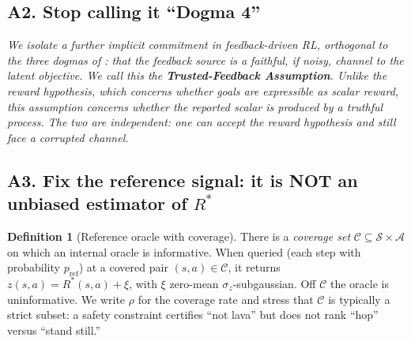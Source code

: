 \documentclass[11pt]{article}
\theoremstyle{definition}
\newtheorem{definition}{Definition}
\theoremstyle{remark}
\newcommand{\Rstar}{R^{\ast}}
\newcommand{\A}{\mathcal{A}}
\newcommand{\Cov}{\mathcal{C}}
\begin{document}
\subsection*{A2. Stop calling it ``Dogma 4''}

\noindent\emph{We isolate a further implicit commitment in feedback-driven RL, orthogonal to the three dogmas of \citet{abel2024three}: that the feedback \emph{source} is a faithful, if noisy, channel to the latent objective. We call this the \textbf{Trusted-Feedback Assumption}. Unlike the reward hypothesis, which concerns whether goals are expressible as scalar reward, this assumption concerns whether the reported scalar is produced by a truthful process. The two are independent: one can accept the reward hypothesis and still face a corrupted channel.}

\subsection*{A3. Fix the reference signal: it is NOT an unbiased estimator of $\Rstar$}

\begin{definition}[Reference oracle with coverage]
\label{def:reference}
There is a \emph{coverage set} $\Cov \subseteq \mathcal{S}\times\A$ on which an internal
oracle is informative. When queried (each step with probability $p_{\mathrm{ref}}$) at a
covered pair $(s,a)\in\Cov$, it returns $z(s,a)=\Rstar(s,a)+\xi$, with $\xi$ zero-mean
$\sigma_z$-subgaussian. Off $\Cov$ the oracle is uninformative. We write $\rho$ for the
coverage rate and stress that $\Cov$ is typically a strict subset: a safety constraint
certifies ``not lava'' but does not rank ``hop'' versus ``stand still.''
\end{definition}
\end{document}
